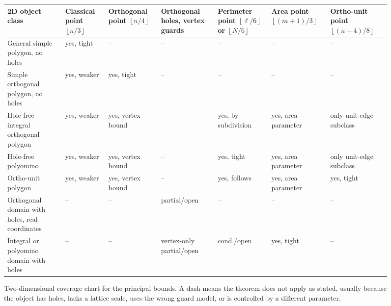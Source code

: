 \documentclass[11pt]{article}
\newcommand{\floor}[1]{\left\lfloor #1 \right\rfloor}
\newcommand{\covered}[1]{\cellcolor{ReviewGreen}#1}
\newcommand{\weaker}[1]{\cellcolor{ReviewGreenLight}#1}
\newcommand{\limited}[1]{\cellcolor{ReviewBlueLight}#1}
\newcommand{\uncertaincell}[1]{\cellcolor{ReviewYellow}#1}
\newcommand{\outside}{\cellcolor{ReviewGray}--}
\begin{document}
\begin{figure}[htbp]
\centering
\scriptsize
\setlength{\tabcolsep}{2pt}
\renewcommand{\arraystretch}{1.22}
\begin{tabularx}{\textwidth}{
  >{\raggedright\arraybackslash}p{}
  *{6}{>{\centering\arraybackslash}X}}
\toprule
2D object class &
Classical point $\floor{n/3}$ &
Orthogonal point $\floor{n/4}$ &
Orthogonal holes, vertex guards &
Perimeter point $\floor{\ell/6}$ or $\floor{N/6}$ &
Area point $\floor{(m+1)/3}$ &
Ortho-unit point $\floor{(n-4)/8}$ \\
\midrule
General simple polygon, no holes &
\covered{yes, tight} &
\outside &
\outside &
\outside &
\outside &
\outside \\

Simple orthogonal polygon, no holes &
\weaker{yes, weaker} &
\covered{yes, tight} &
\outside &
\outside &
\outside &
\outside \\

Hole-free integral orthogonal polygon &
\weaker{yes, weaker} &
\weaker{yes, vertex bound} &
\outside &
\covered{yes, by subdivision} &
\limited{yes, area parameter} &
\limited{only unit-edge subclass} \\

Hole-free polyomino &
\weaker{yes, weaker} &
\weaker{yes, vertex bound} &
\outside &
\covered{yes, tight} &
\limited{yes, area parameter} &
\limited{only unit-edge subclass} \\

Ortho-unit polygon &
\weaker{yes, weaker} &
\weaker{yes, vertex bound} &
\outside &
\covered{yes, follows} &
\limited{yes, area parameter} &
\covered{yes, tight} \\

Orthogonal domain with holes, real coordinates &
\outside &
\outside &
\uncertaincell{partial/open} &
\outside &
\outside &
\outside \\

Integral or polyomino domain with holes &
\outside &
\outside &
\uncertaincell{vertex-only partial/open} &
\uncertaincell{cond./open} &
\covered{yes, tight} &
\outside \\
\bottomrule
\end{tabularx}
\caption{Two-dimensional coverage chart for the principal bounds.  A dash
means the theorem does not apply as stated, usually because the object has
holes, lacks a lattice scale, uses the wrong guard model, or is controlled by a
different parameter.}
\label{fig:2d-coverage}
\end{figure}
\end{document}
